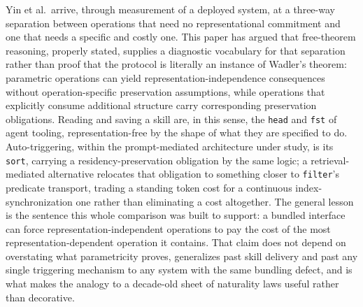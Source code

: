 \documentclass[11pt]{article}
\begin{document}
Yin et al.\ arrive, through measurement of a deployed system, at a three-way separation between operations that need no representational commitment and one that needs a specific and costly one. This paper has argued that free-theorem reasoning, properly stated, supplies a diagnostic vocabulary for that separation rather than proof that the protocol is literally an instance of Wadler's theorem: parametric operations can yield representation-independence consequences without operation-specific preservation assumptions, while operations that explicitly consume additional structure carry corresponding preservation obligations. Reading and saving a skill are, in this sense, the \texttt{head} and \texttt{fst} of agent tooling, representation-free by the shape of what they are specified to do. Auto-triggering, within the prompt-mediated architecture under study, is its \texttt{sort}, carrying a residency-preservation obligation by the same logic; a retrieval-mediated alternative relocates that obligation to something closer to \texttt{filter}'s predicate transport, trading a standing token cost for a continuous index-synchronization one rather than eliminating a cost altogether. The general lesson is the sentence this whole comparison was built to support: a bundled interface can force representation-independent operations to pay the cost of the most representation-dependent operation it contains. That claim does not depend on overstating what parametricity proves, generalizes past skill delivery and past any single triggering mechanism to any system with the same bundling defect, and is what makes the analogy to a decade-old sheet of naturality laws useful rather than decorative.
\end{document}
